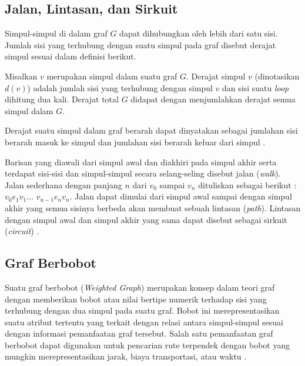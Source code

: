 {    \subsection{Jalan, Lintasan, dan Sirkuit}
    {\frenchspacing
        Simpul-simpul di dalam graf $G$ dapat dihubungkan oleh lebih dari satu sisi.
        Jumlah sisi yang terhubung dengan suatu simpul pada graf disebut derajat simpul sesuai dalam definisi berikut.
        \begin{definisi}
            \label{def:Derajat Graf}
            Misalkan $v$ merupakan simpul dalam suatu graf $G$.
            Derajat simpul $v$ (dinotasikan $d(v)$) adalah jumlah sisi yang terhubung dengan simpul $v$
            dan sisi suatu \textit{loop} dihitung dua kali.
            Derajat total $G$ didapat dengan menjumlahkan derajat semua simpul dalam $G$.
        \end{definisi}
        \noindent
        Derajat suatu simpul dalam graf berarah dapat dinyatakan sebagai jumlahan sisi berarah masuk ke simpul dan jumlahan sisi
        berarah keluar dari simpul .

        Barisan yang diawali dari simpul awal dan diakhiri pada simpul akhir serta
        terdapat sisi-sisi dan simpul-simpul secara selang-seling disebut jalan (\textit{walk}).
        Jalan sederhana dengan panjang $n$ dari $v_{0}$ sampai $v_{n}$ dituliskan sebagai berikut :
        $v_{0} e_{1} v_{1} \dots $ $v_{n-1} e_{n} v_{n}$.
        Jalan dapat dimulai dari simpul awal sampai dengan simpul akhir yang semua sisinya berbeda akan membuat sebuah lintasan (\textit{path}).
        Lintasan dengan simpul awal dan simpul akhir yang sama dapat disebut sebagai sirkuit (\textit{circuit}) .
    }

    \vspace{-5mm}
    \subsection{Graf Berbobot}
    {\frenchspacing
        Suatu graf berbobot (\textit{Weighted Graph}) merupakan konsep dalam teori graf dengan memberikan bobot atau
        nilai bertipe numerik terhadap sisi yang terhubung dengan dua simpul pada suatu graf.
        Bobot ini merepresentasikan suatu atribut tertentu yang terkait dengan relasi antara simpul-simpul sesuai
        dengan informasi pemanfaatan graf tersebut.
        Salah satu pemanfaatan graf berbobot dapat digunakan untuk pencarian rute terpendek dengan bobot yang mungkin
        merepresentasikan jarak, biaya transportasi, atau waktu .
    }

}
